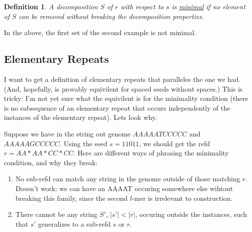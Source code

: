 \documentclass{article}
\newtheorem{definition}{Definition}
\begin{document}
\begin{definition}
A decomposition $S$ of $r$ with respect to $s$ is \underline{minimal}
if no element of $S$ can be removed without breaking the decomposition
properties. 
\end{definition}
In the above, the first set of the second example is not minimal. 


\subsection{Elementary Repeats}

I want to get a definition of elementary repeats that paralleles the
one we had.  (And, hopefully, is provably equivilent for spaced seeds
without spaces.)  This is tricky: I'm not yet sure what the equivilent
is for the minimality condition (there is no subsequence of an
elementary repeat that occurs independently of the instances of the
elementary repeat).  Lets look why. 

Suppose we have in the string out genome $AAAAATCCCCC$ and
$AAAAAGCCCCC$.  Using the seed $s=11011$, we should get the refd
$r=AA*AA*CC*CC$. Here are different ways of phrasing the minimality
condition, and why they break:
\begin{enumerate}
\item No sub-refd can match any string in the genome outside of those
  matching $r$.  Doesn't work: we can have an AAAAT occuring somewhere
  else wihtout breaking this family, since the second $l$-mer is
  irrelevant to construction.
\item There cannot be any string $S'$, $|s'| < |r|$, occuring outside
  the instances, such that $s'$ generalizes to a sub-refd $s$ or $r$.
\end{enumerate}
\end{document}
